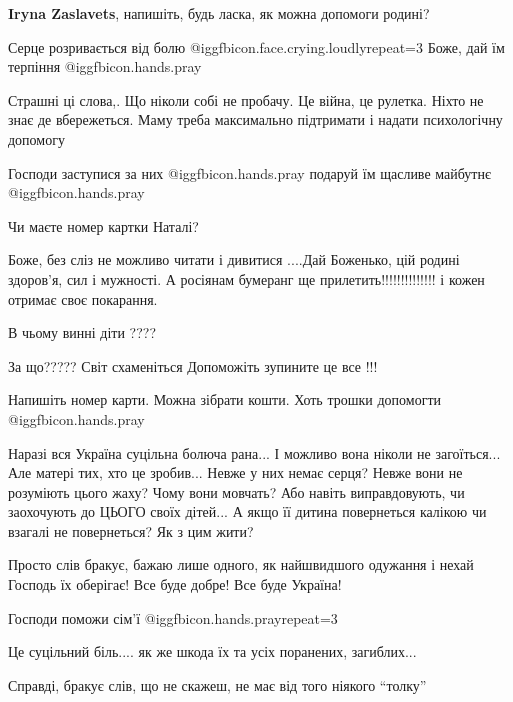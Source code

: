 \begin{itemize}
\textbf{Iryna Zaslavets}, напишіть, будь ласка, як можна допомоги родині?

Серце розривається від болю @igg{fbicon.face.crying.loudly}{repeat=3}  Боже, дай їм терпіння  @igg{fbicon.hands.pray} 


Страшні ці слова,. Що ніколи собі не пробачу. Це війна, це рулетка. Ніхто не
знає де вбережеться. Маму треба максимально підтримати і надати психологічну
допомогу

Господи заступися за них @igg{fbicon.hands.pray} подаруй їм щасливе майбутнє  @igg{fbicon.hands.pray} 

Чи маєте номер картки Наталі?


Боже, без сліз не можливо читати і дивитися ....Дай Боженько, цій родині
здоров'я, сил і мужності. А росіянам бумеранг ще прилетить!!!!!!!!!!!!!! і кожен
отримає своє покарання.

В чьому винні діти ????

За що?????
Світ схаменіться
Допоможіть зупините це все !!!


Напишіть номер карти. Можна зібрати кошти. Хоть трошки допомогти @igg{fbicon.hands.pray} 


Наразі вся Україна суцільна болюча рана... І можливо вона ніколи не
загоїться... Але матері тих, хто це зробив... Невже у них немає серця? Невже
вони не розуміють цього жаху? Чому вони мовчать? Або навіть виправдовують, чи
заохочують до ЦЬОГО своїх дітей... А якщо її дитина повернеться калікою чи
взагалі не повернеться? Як з цим жити?


Просто слів бракує, бажаю лише одного, як найшвидшого одужання і нехай Господь
їх оберігає! Все буде добре! Все буде Україна!

Господи поможи сім'ї  @igg{fbicon.hands.pray}{repeat=3} 


Це суцільний біль.... як же шкода їх та усіх поранених, загиблих...

Справді, бракує слів, що не скажеш, не має від того ніякого \enquote{толку}


\end{itemize}
